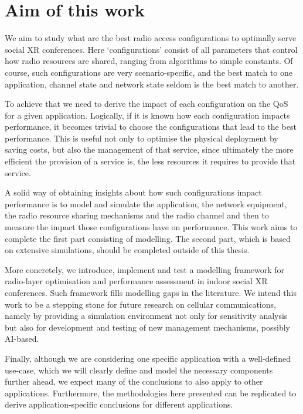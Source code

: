 \section{Aim of this work}
\label{sec:aim}

We aim to study what are the best radio access configurations to optimally serve social \ac{XR} conferences. Here `configurations' consist of all parameters that control how radio resources are shared, ranging from algorithms to simple constants. Of course, such configurations are very scenario-specific, and the best match to one application, channel state and network state seldom is the best match to another.

To achieve that we need to derive the impact of each configuration on the \ac{QoS} for a given application. Logically, if it is known how each configuration impacts performance, it becomes trivial to choose the configurations that lead to the best performance. This is useful not only to optimise the physical deployment by saving costs, but also the management of that service, since ultimately the more efficient the provision of a service is, the less resources it requires to provide that service.

A solid way of obtaining insights about how such configurations impact performance is to model and simulate the application, the network equipment, the radio resource sharing mechanisms and the radio channel and then to measure the impact those configurations have on performance. This work aims to complete the first part consisting of modelling. The second part, which is based on extensive simulations, should be completed outside of this thesis.

More concretely, we introduce, implement and test a modelling framework for radio-layer optimisation and performance assessment in indoor social XR conferences. Such framework fills modelling gaps in the literature. We intend this work to be a stepping stone for future research on cellular communications, namely by providing a simulation environment not only for sensitivity analysis but also for development and testing of new management mechanisms, possibly AI-based.

Finally, although we are considering one specific application with a well-defined use-case, which we will clearly define and model the necessary components further ahead, we expect many of the conclusions to also apply to other applications. Furthermore, the methodologies here presented can be replicated to derive application-specific conclusions for different applications.





